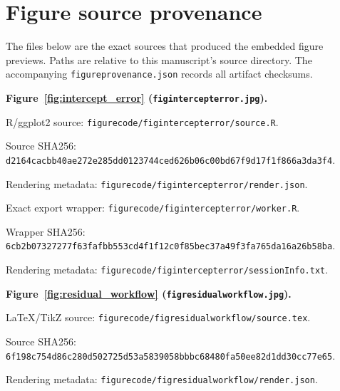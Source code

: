\documentclass[11pt]{article}
\begin{document}
\clearpage
\section*{Figure source provenance}
The files below are the exact sources that produced the embedded figure previews. Paths are relative to this manuscript's source directory. The accompanying \texttt{figureprovenance.json} records all artifact checksums.\par
\medskip\noindent\textbf{Figure~\ref{fig:intercept_error} (\texttt{figintercepterror.jpg}).}\par
\noindent R/ggplot2 source: \texttt{figurecode/\allowbreak{}figintercepterror/\allowbreak{}source.R}.\par
\noindent Source SHA256: \texttt{d2164cac\allowbreak{}bb40ae27\allowbreak{}2e285dd0\allowbreak{}123744ce\allowbreak{}d626b06c\allowbreak{}00bd67f9\allowbreak{}d17f1f86\allowbreak{}6a3da3f4}.\par
\noindent Rendering metadata: \texttt{figurecode/\allowbreak{}figintercepterror/\allowbreak{}render.json}.\par
\noindent Exact export wrapper: \texttt{figurecode/\allowbreak{}figintercepterror/\allowbreak{}worker.R}.\par
\noindent Wrapper SHA256: \texttt{6cb2b073\allowbreak{}27277f63\allowbreak{}fafbb553\allowbreak{}cd4f1f12\allowbreak{}c0f85bec\allowbreak{}37a49f3f\allowbreak{}a765da16\allowbreak{}a26b58ba}.\par
\noindent Rendering metadata: \texttt{figurecode/\allowbreak{}figintercepterror/\allowbreak{}sessionInfo.txt}.\par
\medskip\noindent\textbf{Figure~\ref{fig:residual_workflow} (\texttt{figresidualworkflow.jpg}).}\par
\noindent LaTeX/TikZ source: \texttt{figurecode/\allowbreak{}figresidualworkflow/\allowbreak{}source.tex}.\par
\noindent Source SHA256: \texttt{6f198c75\allowbreak{}4d86c280\allowbreak{}d502725d\allowbreak{}53a58390\allowbreak{}58bbbc68\allowbreak{}480fa50e\allowbreak{}e82d1dd3\allowbreak{}0cc77e65}.\par
\noindent Rendering metadata: \texttt{figurecode/\allowbreak{}figresidualworkflow/\allowbreak{}render.json}.\par
\end{document}
